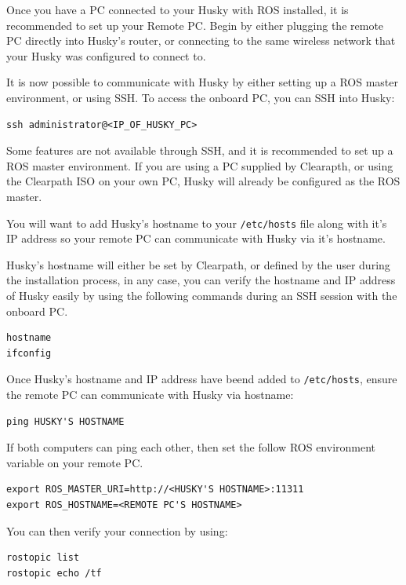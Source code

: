 \documentclass[]{clearpath-latex/clearpath-manual}
\begin{document}
Once you have a PC connected to your Husky with ROS installed, it is recommended to set up your Remote PC.  
Begin by either plugging the remote PC directly into Husky’s router, or connecting to the same wireless network 
that your Husky was configured to connect to.  

It is now possible to communicate with Husky by either setting up a ROS master environment, or using SSH.  
To access the onboard PC, you can SSH into Husky:

\begin{lstlisting} 
ssh administrator@<IP_OF_HUSKY_PC>
\end{lstlisting}

Some features are not available through SSH, and it is recommended to set up a ROS master environment. 
If you are using a PC supplied by Clearapth, or using the Clearpath ISO on your own PC, Husky will
already be configured as the ROS master.

You will want to add Husky's hostname to your \lstinline{/etc/hosts} file along with it's IP address 
so your remote PC can communicate with Husky via it's hostname.

Husky's hostname will either be set by Clearpath, or defined by the user during the 
installation process, in any case, you can verify the hostname and IP address of Husky easily by using
the following commands during an SSH session with the onboard  PC.

\begin{lstlisting}
hostname
ifconfig
\end{lstlisting}


Once Husky's hostname and IP address have beend added to \lstinline{/etc/hosts}, ensure the remote PC
can communicate with Husky via hostname:

\begin{lstlisting}
ping HUSKY'S HOSTNAME
\end{lstlisting}

If both computers can ping each other, then set the follow ROS environment variable on your remote PC.

\begin{lstlisting}
export ROS_MASTER_URI=http://<HUSKY'S HOSTNAME>:11311
export ROS_HOSTNAME=<REMOTE PC'S HOSTNAME>
\end{lstlisting}

You can then verify your connection by using:

\begin{lstlisting}
rostopic list
rostopic echo /tf
\end{lstlisting}
\end{document}

